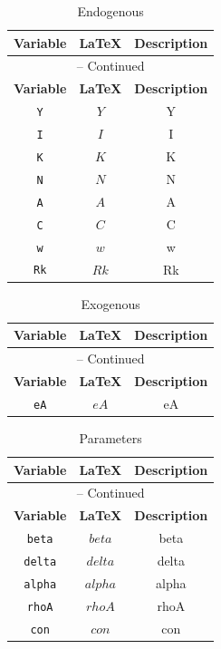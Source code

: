 \begin{center}
\begin{longtable}{ccc}
\caption{Endogenous}\\%
\hline%
\multicolumn{1}{c}{\textbf{Variable}} &
\multicolumn{1}{c}{\textbf{\LaTeX}} &
\multicolumn{1}{c}{\textbf{Description}}\\%
\hline\hline%
\endfirsthead
\multicolumn{3}{c}{{\tablename} \thetable{} -- Continued}\\%
\hline%
\multicolumn{1}{c}{\textbf{Variable}} &
\multicolumn{1}{c}{\textbf{\LaTeX}} &
\multicolumn{1}{c}{\textbf{Description}}\\%
\hline\hline%
\endhead
\texttt{Y} & $Y$ & Y\\
\texttt{I} & $I$ & I\\
\texttt{K} & $K$ & K\\
\texttt{N} & $N$ & N\\
\texttt{A} & $A$ & A\\
\texttt{C} & $C$ & C\\
\texttt{w} & $w$ & w\\
\texttt{Rk} & $Rk$ & Rk\\
\hline%
\end{longtable}
\end{center}
\begin{center}
\begin{longtable}{ccc}
\caption{Exogenous}\\%
\hline%
\multicolumn{1}{c}{\textbf{Variable}} &
\multicolumn{1}{c}{\textbf{\LaTeX}} &
\multicolumn{1}{c}{\textbf{Description}}\\%
\hline\hline%
\endfirsthead
\multicolumn{3}{c}{{\tablename} \thetable{} -- Continued}\\%
\hline%
\multicolumn{1}{c}{\textbf{Variable}} &
\multicolumn{1}{c}{\textbf{\LaTeX}} &
\multicolumn{1}{c}{\textbf{Description}}\\%
\hline\hline%
\endhead
\texttt{eA} & $eA$ & eA\\
\hline%
\end{longtable}
\end{center}
\begin{center}
\begin{longtable}{ccc}
\caption{Parameters}\\%
\hline%
\multicolumn{1}{c}{\textbf{Variable}} &
\multicolumn{1}{c}{\textbf{\LaTeX}} &
\multicolumn{1}{c}{\textbf{Description}}\\%
\hline\hline%
\endfirsthead
\multicolumn{3}{c}{{\tablename} \thetable{} -- Continued}\\%
\hline%
\multicolumn{1}{c}{\textbf{Variable}} &
\multicolumn{1}{c}{\textbf{\LaTeX}} &
\multicolumn{1}{c}{\textbf{Description}}\\%
\hline\hline%
\endhead
\texttt{beta} & $beta$ & beta\\
\texttt{delta} & $delta$ & delta\\
\texttt{alpha} & $alpha$ & alpha\\
\texttt{rhoA} & $rhoA$ & rhoA\\
\texttt{con} & $con$ & con\\
\hline%
\end{longtable}
\end{center}
